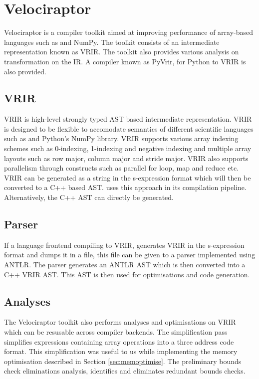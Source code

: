 \section{Velociraptor}
Velociraptor is a compiler toolkit aimed at improving performance of array-based languages such as \matlab and NumPy. The toolkit consists of an intermediate representation known as VRIR. The toolkit also provides various analysis on transformation on the IR. A compiler known as PyVrir, for Python to VRIR is also provided. 
\subsection{VRIR}
VRIR is high-level strongly typed AST based intermediate representation. VRIR is designed to be flexible to accomodate semantics of different scientific languages such as \matlab and Python's NumPy library. VRIR supports various array indexing schemes such as 0-indexing, 1-indexing and negative indexing and multiple array layouts such as row major, column major and stride major. VRIR also supports parallelism through constructs such as parallel for loop, map and reduce etc. VRIR can be generated as a string in the s-expression format which will then be converted to a C++ based AST. \velocty uses this approach in its compilation pipeline. Alternatively, the C++ AST can directly be generated.

\subsection{Parser}
If a language frontend compiling to VRIR, generates VRIR in the s-expression format and dumps it in a file, this file can be given to a parser implemented using ANTLR\cite{antlr}. The parser generates an ANTLR AST which is then converted into a C++ VRIR AST. This AST is then used for optimisations and code generation.  
\subsection{Analyses}
The Velociraptor toolkit also performs analyses and optimisations on VRIR which  can be resusable across compiler backends. The simplification pass simplifies expressions containing array operations into a three address code format. This simplification was useful to us while implementing the memory optimisation described in Section \ref{sec:memoptimise}. The preliminary bounds check eliminations analysis, identifies and eliminates redundant bounds checks.
